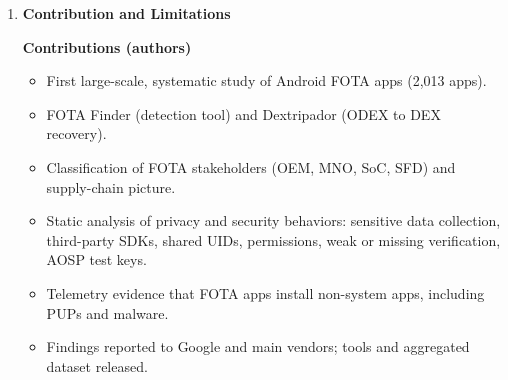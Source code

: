 \documentclass[11pt,a4paper]{article}
\newcommand{\entrypart}[1]{\textbf{\color{accent}#1}\par\vspace{2pt}}
\begin{document}
\begin{enumerate}
\begin{itemize}[leftmargin=*,itemsep=1pt,topsep=2pt]
\begin{itemize}[itemsep=0pt]
            \item 13 of 20 installers install 764 packages that exist on Google Play (50 categories; Tools 20\%, Entertainment 9\%, Communication 9\%, Games 8\%, Shopping 7\%).
            \item 7 of 20 FOTA packages install at least one unwanted app; five have 0.1\% to 2.8\% unwanted.
            \item \texttt{com.android.settings}: 494 malicious APKs (35\%); families include triada and necro.
            \item \texttt{com.qiku.android.ota}: 11 of 12 APKs malicious (92\%); triada, necro, guerilla.
            \item \texttt{com.sonyericsson.updatecenter}: 12.6M events, 381K devices; \texttt{com.samsung.android.app.omcagent}: 3.0M events, 332K devices, 29 malicious APKs (1.5\%).
        \end{itemize}
        \item \textbf{Samsung native code:} 149 devices with FOTA app plus \texttt{libmno\_dmstack.so}; manual analysis shows update by writing to \texttt{/cache/recovery/command}.
    \end{itemize}

    \item \entrypart{Contribution and Limitations}

    \textbf{Contributions (authors)}
    \begin{itemize}[leftmargin=*,itemsep=1pt,topsep=2pt]
        \item First large-scale, systematic study of Android FOTA apps (2,013 apps).
        \item FOTA Finder (detection tool) and Dextripador (ODEX to DEX recovery).
        \item Classification of FOTA stakeholders (OEM, MNO, SoC, SFD) and supply-chain picture.
        \item Static analysis of privacy and security behaviors: sensitive data collection, third-party SDKs, shared UIDs, permissions, weak or missing verification, AOSP test keys.
        \item Telemetry evidence that FOTA apps install non-system apps, including PUPs and malware.
        \item Findings reported to Google and main vendors; tools and aggregated dataset released.
    \end{itemize}


\end{enumerate}
\end{document}
